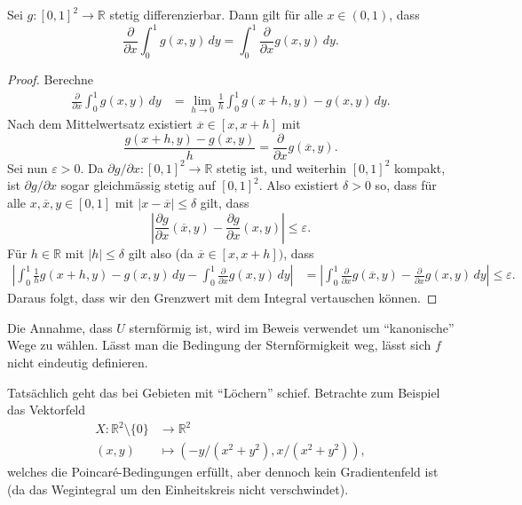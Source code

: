\documentclass[../main.tex]{subfiles}
\begin{document}
\begin{lemma*}
  Sei $g \colon {[0, 1]}^2 \to \mathbb{R}$ stetig differenzierbar.
  Dann gilt für alle $x \in (0, 1)$, dass
  \[
    \frac{\partial}{\partial x} \int_{0}^{1} g(x, y) \, dy
    = \int_{0}^{1} \frac{\partial}{\partial x} g(x, y) \, dy.
  \]
\end{lemma*}

\begin{proof}
  Berechne
  \begin{align*}
    \frac{\partial}{\partial x}
    \int_{0}^{1} g(x, y) \, dy
    &= \lim_{h \to 0} \frac{1}{h}
    \int_{0}^{1} g(x + h, y) - g(x, y) \, dy.
  \end{align*}
  Nach dem Mittelwertsatz existiert
  $\overline x \in [x, x + h]$ mit
  \[
    \frac{g(x + h, y) - g(x, y)}{h}= \frac{\partial}{\partial x}
    g(\overline x, y).
  \]
  Sei nun $\varepsilon > 0$.
  Da $\partial g / \partial x \colon {[0, 1]}^2 \to \mathbb{R}$ 
  stetig ist, und weiterhin ${[0, 1]}^2$ kompakt,
  ist $\partial g/\partial x$ sogar gleichmässig stetig
  auf  ${[0, 1]}^2$.
  Also existiert $\delta > 0$ so, dass für alle
  $x, \overline x, y \in [0,1]$ mit $|x - \overline x| \leq \delta$ 
  gilt, dass
  \[
    \left| \frac{\partial g}{\partial x}(\overline x, y)
    - \frac{\partial g}{\partial x}(x, y) \right| \leq \varepsilon.
  \]
  Für $h \in \mathbb{R}$ mit $|h| \leq \delta$ 
  gilt also (da $\overline x \in [x, x + h])$, dass
  \begin{align*}
    \left| \int_{0}^{1} \frac{1}{h}
    g(x + h, y) - g(x, y)\, dy
    - \int_{0}^{1} \frac{\partial}{\partial x}g(x, y) \, dy \right|
    &= \left| 
    \int_{0}^{1} 
    \frac{\partial}{\partial x} g(\overline x, y)
    - \frac{\partial}{\partial x}g(x, y)\, dy \right| 
    \leq \varepsilon.
  \end{align*}
  Daraus folgt, dass wir den Grenzwert mit dem Integral
  vertauschen können.
\end{proof}

\begin{remark}
  Die Annahme, dass $U$ sternförmig ist, wird im Beweis
  verwendet um ``kanonische'' Wege zu wählen.
  Lässt man die Bedingung der Sternförmigkeit weg,
  lässt sich $f$ nicht eindeutig definieren.

  Tatsächlich geht das bei Gebieten mit ``Löchern''
  schief. Betrachte zum
  Beispiel das Vektorfeld
  \begin{align*}
    X \colon \mathbb{R}^2 \setminus \{0\} & \to \mathbb{R}^2\\
    (x, y) & \mapsto (-y/(x^2 + y^2), x/(x^2 + y^2)),
  \end{align*}
  welches die Poincaré-Bedingungen erfüllt, aber dennoch
  kein Gradientenfeld ist (da das Wegintegral um den Einheitskreis
  nicht verschwindet).
\end{remark}
\end{document}

